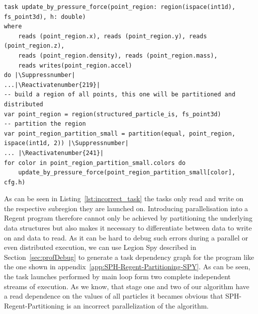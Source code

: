 \documentclass{article}      %
\begin{document}
\lstset{
	captionpos=b,
	style=regent,
	basicstyle=\scriptsize,
	numbers=left,
	numberstyle=\tiny,
	columns=fullflexible,
	firstnumber=119,
	stepnumber=1,
	escapeinside=||,
}

\begin{lstlisting}[frame=single,label={lst:incorrect_task},
	caption={Task signature for the second stage of the algorithm and its task launch in the main loop of SPH-Regent-Partitioning.}]
task update_by_pressure_force(point_region: region(ispace(int1d), fs_point3d), h: double)
where
	reads (point_region.x), reads (point_region.y), reads (point_region.z),
	reads (point_region.density), reads (point_region.mass),
	reads writes(point_region.accel)
do |\Suppressnumber|
...|\Reactivatenumber{219}|
-- build a region of all points, this one will be partitioned and distributed
var point_region = region(structured_particle_is, fs_point3d)
-- partition the region
var point_region_partition_small = partition(equal, point_region, ispace(int1d, 2)) |\Suppressnumber|
... |\Reactivatenumber{241}|
for color in point_region_partition_small.colors do
	update_by_pressure_force(point_region_partition_small[color], cfg.h)
\end{lstlisting}

As can be seen in Listing~\ref{lst:incorrect_task} the tasks only read and write on the respective subregion they are launched on. Introducing parallelisation into a Regent program therefore cannot only be achieved by partitioning the underlying data structures but also makes it necessary to differentiate between data to write on and data to read. As it can be hard to debug such errors during a parallel or even distributed execution, we can use Legion Spy described in Section~\ref{sec:profDebug} to generate a task dependency graph for the program like the one shown in appendix~\ref{app:SPH-Regent-Partitioning-SPY}. As can be seen, the task launches performed by main loop form two complete independent streams of execution. As we know, that stage one and two of our algorithm have a read dependence on the values of all particles it becames obvious that SPH-Regent-Partitioning is an incorrect parallelization of the algorithm. 
\end{document}
